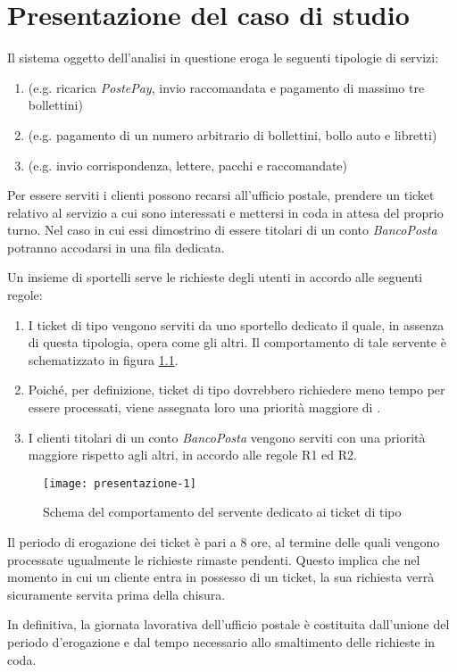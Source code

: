 \chapter{Presentazione del caso di studio}\label{chp:presentazione}
Il sistema oggetto dell'analisi in questione eroga le seguenti tipologie di servizi:
\begin{enumerate}
\item \uo{} (e.g. ricarica \textsl{PostePay}, invio raccomandata e pagamento di massimo tre bollettini)
\item \pp{} (e.g. pagamento di un numero arbitrario di bollettini, bollo auto e libretti)  
\item \sr{} (e.g. invio corrispondenza, lettere, pacchi e raccomandate)
\end{enumerate}

Per essere serviti i clienti possono recarsi all'ufficio postale, prendere un ticket relativo al servizio a cui sono interessati e mettersi in coda in attesa del proprio turno. Nel caso in cui essi dimostrino di essere titolari di un conto \textsl{BancoPosta} potranno accodarsi in una fila dedicata.

Un insieme di sportelli serve le richieste degli utenti in accordo alle seguenti regole: 
\begin{enumerate}[label=R\arabic*), align=left, leftmargin=*]
\item I ticket di tipo \sr{} vengono serviti da uno sportello dedicato il quale, in assenza di questa tipologia, opera come gli altri. Il comportamento di tale servente è schematizzato in figura \ref{fig:presentazione-1}. 
\item Poiché, per definizione, ticket di tipo \uo{} dovrebbero richiedere meno tempo per essere processati, viene assegnata loro una priorità maggiore di \pp{}.
\item I clienti titolari di un conto \textsl{BancoPosta} vengono serviti con una priorità maggiore rispetto agli altri, in accordo alle regole R1 ed R2.
\end{enumerate}

\begin{figure}[ht]
\centering
\texttt{[image: presentazione-1]}
\caption{Schema del comportamento del servente dedicato ai ticket di tipo \sr}
\label{fig:presentazione-1}
\end{figure}

Il periodo di erogazione dei ticket è pari a 8 ore, al termine delle quali vengono processate ugualmente le richieste rimaste pendenti. Questo implica che nel momento in cui un cliente entra in possesso di un ticket, la sua richiesta verrà sicuramente servita prima della chisura. 

In definitiva, la giornata lavorativa dell'ufficio postale è costituita dall'unione del periodo d'erogazione e dal tempo necessario allo smaltimento delle richieste in coda.
